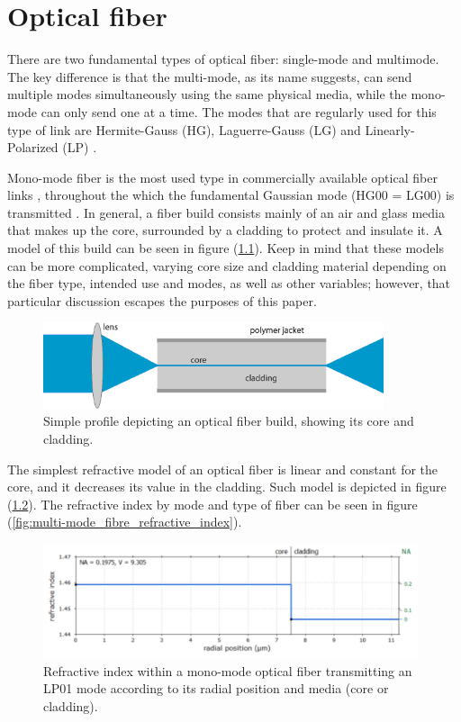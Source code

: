 \chapter{Optical fiber}
\label{FiberOptics}

There are two fundamental types of optical fiber: single-mode and multimode. The key difference is that the multi-mode, as its name suggests, can send multiple modes simultaneously using the same physical media, while the mono-mode can only send one at a time. The modes that are regularly used for this type of link are Hermite-Gauss (HG), Laguerre-Gauss (LG) and Linearly-Polarized (LP) \cite{FiberOptics_Modes}.

Mono-mode fiber is the most used type in commercially available optical fiber links \cite{Single-Mode_Fiber_Optic}, throughout the which the fundamental Gaussian mode (HG00 = LG00) is transmitted \cite{LP_Modes}. In general, a fiber build consists mainly of an air and glass media that makes up the core, surrounded by a cladding to protect and insulate it. A model of this build can be seen in figure (\ref{fig:fiber_profile}). Keep in mind that these models can be more complicated, varying core size and cladding material depending on the fiber type, intended use and modes, as well as other variables; however, that particular discussion escapes the purposes of this paper.

\begin{figure}[htbp]
    \centering
    \includegraphics[width=10cm]{images/Appendices/fiber.png}
    \caption{Simple profile depicting an optical fiber build, showing its core and cladding.}
    \label{fig:fiber_profile}
\end{figure}

The simplest refractive model of an optical fiber is linear and constant for the core, and it decreases its value in the cladding. Such model is depicted in figure (\ref{fig:single-mode_fibre_refractive_index}). The refractive index by mode and type of fiber can be seen in figure (\ref{fig:multi-mode_fibre_refractive_index}).

\begin{figure}[htbp]
    \centering
    \includegraphics[width=11cm]{images/Appendices/step_index_fiber.png}
    \caption{Refractive index within a mono-mode optical fiber transmitting an LP01 mode according to its radial position and media (core or cladding)\cite{Single-Mode_Fiber_Optic}.}
    \label{fig:single-mode_fibre_refractive_index}
\end{figure}

